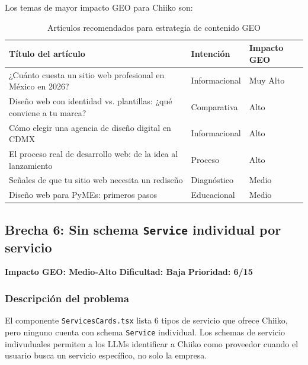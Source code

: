 \documentclass[12pt, a4paper]{article}
\begin{document}
Los temas de mayor impacto GEO para Chiiko son:

\begin{table}[H]
\centering
{}
\begin{tabularx}{\textwidth}{L{7cm} C{3cm} C{3cm}}
  \toprule
  \textbf{Título del artículo} & \textbf{Intención} & \textbf{Impacto GEO} \\
  \midrule
  ¿Cuánto cuesta un sitio web profesional en México en 2026? & Informacional & Muy Alto \\
  Diseño web con identidad vs. plantillas: ¿qué conviene a tu marca? & Comparativa & Alto \\
  Cómo elegir una agencia de diseño digital en CDMX & Informacional & Alto \\
  El proceso real de desarrollo web: de la idea al lanzamiento & Proceso & Alto \\
  Señales de que tu sitio web necesita un rediseño & Diagnóstico & Medio \\
  Diseño web para PyMEs: primeros pasos & Educacional & Medio \\
  \bottomrule
\end{tabularx}
\caption{Artículos recomendados para estrategia de contenido GEO}
\end{table}

\subsection{Brecha 6: Sin schema \texttt{Service} individual por servicio}

\begin{highbox}
\textbf{Impacto GEO: Medio-Alto} \quad \textbf{Dificultad: Baja} \quad \textbf{Prioridad: 6/15}
\end{highbox}

\subsubsection{Descripción del problema}

El componente \texttt{ServicesCards.tsx} lista 6 tipos de servicio que ofrece Chiiko, pero ninguno cuenta con schema \texttt{Service} individual. Los schemas de servicio indivuduales permiten a los LLMs identificar a Chiiko como proveedor cuando el usuario busca un servicio específico, no solo la empresa.
\end{document}

